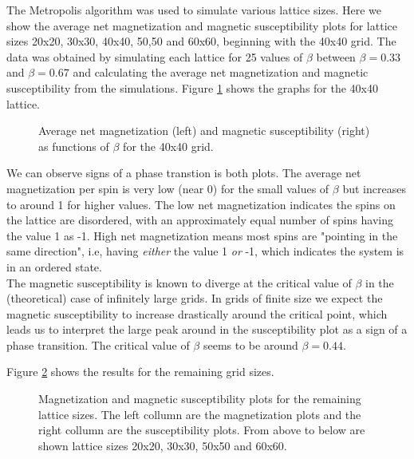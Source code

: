 \documentclass[11pt,a4paper]{article}
\begin{document}
The Metropolis algorithm was used to simulate various lattice sizes. Here we show the average net magnetization and magnetic 
 susceptibility plots for lattice sizes 20x20, 30x30, 40x40, 50,50 and 60x60, beginning with the 40x40 grid. The data was 
 obtained by simulating each lattice for 25 values of $\beta$ between $\beta = 0.33$ and $\beta = 0.67$ and calculating the 
 average net magnetization and magnetic susceptibility from the simulations. Figure \ref{fig:meto_40} shows the graphs for the
 40x40 lattice. 


\begin{figure}[H]

  \caption{Average net magnetization (left) and magnetic susceptibility (right) as functions of $\beta$ for the 40x40 grid.}

\label{fig:meto_40}
\end{figure}

We can observe signs of a phase transtion is both plots. The average net magnetization per spin is very low (near 0) for the 
 small values of $\beta$ but increases to around 1 for higher values. The low net magnetization indicates the spins on the lattice
 are disordered, with an approximately equal number of spins having the value 1 as -1. High net magnetization means most spins are
 "pointing in the same direction", i.e, having \textit{either} the value 1 \textit{or} -1, which indicates the system is in an ordered
 state. \\

The magnetic susceptibility is known to diverge at the critical value of $\beta$ in the (theoretical) case of infinitely large grids.
 In grids of finite size we expect the magnetic susceptibility to increase drastically around the critical point, which leads us 
 to interpret the large peak around in the susceptibility plot as a sign of a phase transition. The critical value of $\beta$ seems to 
 be around $\beta = 0.44$. 

Figure \ref{fig:all_metro} shows the results for the remaining grid sizes. 

\begin{figure}[H]

  \caption{Magnetization and magnetic susceptibility plots for the remaining lattice sizes. The left collumn are the magnetization
    plots and the right collumn are the susceptibility plots. From above to below are shown lattice sizes 20x20, 30x30, 50x50 and 
    60x60.}

\label{fig:all_metro}
\end{figure}
\end{document}
